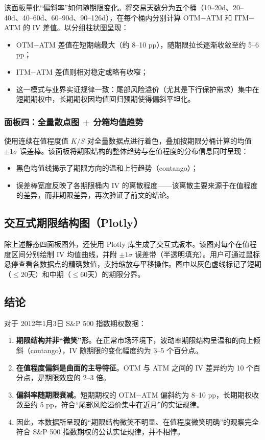 该面板量化“偏斜率”如何随期限变化。将交易天数分为五个桶（10--20d、20--40d、40--60d、60--90d、90--126d），在每个桶内分别计算 OTM$-$ATM 和 ITM$-$ATM 的 IV 差值。以分组柱状图呈现：

\begin{itemize}
    \item OTM$-$ATM 差值在短期端最大（约 8--10 pp），随期限拉长逐渐收敛至约 5--6 pp；
    \item ITM$-$ATM 差值则相对稳定或略有收窄；
    \item 这一模式与业界实证规律一致：尾部风险溢价（尤其是下行保护需求）集中在短期期权中，长期期权因均值回归预期使得偏斜平坦化。
\end{itemize}

\subsubsection{面板四：全量散点图 + 分箱均值趋势}

使用连续在值程度值 $K/S$ 对全量数据点进行着色，叠加按期限分桶计算的均值 $\pm 1\sigma$ 误差棒。该面板将期限结构的整体趋势与在值程度的分布信息同时呈现：

\begin{itemize}
    \item 黑色均值线揭示了期限方向的温和上行趋势（contango）；
    \item 误差棒宽度反映了各期限桶内 IV 的离散程度——该离散主要来源于在值程度的差异，而非期限差异，再次验证了前文的结论。
\end{itemize}

\subsection{交互式期限结构图（Plotly）}

除上述静态四面板图外，还使用 Plotly 库生成了交互式版本。该图对每个在值程度区间分别绘制 IV 均值曲线，并附 $\pm 1\sigma$ 误差带（半透明填充）。用户可通过鼠标悬停查看各数据点的精确数值，支持缩放与平移操作。图中以灰色虚线标记了短期（$\leq 20$天）和中期（$\leq 60$天）的期限分界。

\subsection{结论}

对于 2012年1月3日 S\&P 500 指数期权数据：

\begin{enumerate}[leftmargin=*]
    \item \textbf{期限结构并非“微笑”形}。在正常市场环境下，波动率期限结构呈温和的向上倾斜（contango），IV 随期限的变化幅度约为 3--5 个百分点。
    \item \textbf{在值程度偏斜是曲面的主导特征}。OTM 与 ATM 之间的 IV 差异约为 10 个百分点，是期限效应的 2--3 倍。
    \item \textbf{偏斜率随期限衰减}。短期期权的 OTM$-$ATM 偏斜约为 8--10 pp，长期期权收敛至约 5 pp，符合“尾部风险溢价集中在近月”的实证规律。
    \item 因此，本数据所呈现的“期限结构微笑不明显、在值程度微笑明确”的观察完全符合 S\&P 500 指数期权的公认实证规律，并不相悖。
\end{enumerate}

